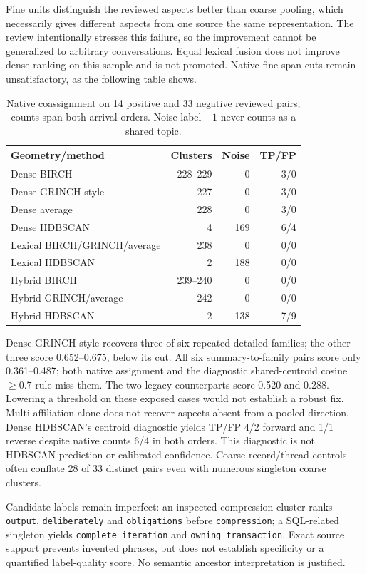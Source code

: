 \documentclass[11pt]{article}
\begin{document}
Fine units distinguish the reviewed aspects better than coarse pooling, which
necessarily gives different aspects from one source the same representation.
The review intentionally stresses this failure, so the improvement cannot be
generalized to arbitrary conversations. Equal lexical fusion does not improve
dense ranking on this sample and is not promoted. Native fine-span cuts remain
unsatisfactory, as the following table shows.

\begin{table}[ht]
\centering
\begin{tabular}{lrrr}
\toprule
Geometry/method &Clusters&Noise&TP/FP\\
\midrule
Dense BIRCH &228--229&0&3/0\\
Dense GRINCH-style &227&0&3/0\\
Dense average &228&0&3/0\\
Dense HDBSCAN &4&169&6/4\\
Lexical BIRCH/GRINCH/average &238&0&0/0\\
Lexical HDBSCAN &2&188&0/0\\
Hybrid BIRCH &239--240&0&0/0\\
Hybrid GRINCH/average &242&0&0/0\\
Hybrid HDBSCAN &2&138&7/9\\
\bottomrule
\end{tabular}
\caption{Native coassignment on 14 positive and 33 negative reviewed pairs;
counts span both arrival orders. Noise label $-1$ never counts as a shared topic.}
\end{table}

Dense GRINCH-style recovers three of six repeated detailed families; the other
three score 0.652--0.675, below its cut. All six summary-to-family pairs score
only 0.361--0.487; both native assignment and the diagnostic shared-centroid
cosine $\geq0.7$ rule miss them. The two legacy counterparts score 0.520 and
0.288. Lowering a threshold on these exposed cases would not establish a robust
fix. Multi-affiliation alone does not recover aspects absent from a pooled
direction. Dense HDBSCAN's centroid diagnostic yields TP/FP 4/2 forward and 1/1
reverse despite native counts 6/4 in both orders. This diagnostic is not
HDBSCAN prediction or calibrated confidence. Coarse record/thread controls often
conflate 28 of 33 distinct pairs even with numerous singleton coarse clusters.

Candidate labels remain imperfect: an inspected compression cluster ranks
\texttt{output}, \texttt{deliberately} and \texttt{obligations} before
\texttt{compression}; a SQL-related singleton yields \texttt{complete iteration}
and \texttt{owning transaction}. Exact source support prevents invented phrases,
but does not establish specificity or a quantified label-quality score.
No semantic ancestor interpretation is justified.
\end{document}
